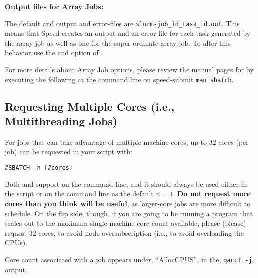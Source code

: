 \textbf{Output files for Array Jobs:}

The default and output and error-files are
\texttt{slurm-job\_id\_task\_id.out}.
%
This means that Speed creates an output and an error-file for each task 
generated by the array-job as well as one for the super-ordinate array-job. 
To alter this behavior use the  and  option of
. 

For more details about Array Job options, please review the manual pages for 
 by executing the following at the command line on speed-submit 
\texttt{man sbatch}.
 
\subsection{Requesting Multiple Cores (i.e., Multithreading Jobs)}

For jobs that can take advantage of multiple machine cores, up to 32 cores
(per job) can be requested in your script with: 

\begin{verbatim}
#SBATCH -n [#cores] 
\end{verbatim}

Both  and  support  on the command line,
and it should always be used either in the script or on the command line as the
default $n=1$.
\textbf{Do not request more cores than you think will be useful}, as larger-core
jobs are more difficult to schedule. On the flip side, though, if you 
are going to be running a program that scales out to the maximum single-machine
core count available, please (please) request 32 cores, to avoid node 
oversubscription (i.e., to avoid overloading the CPUs).

Core count associated with a job appears under,
``AllocCPUS'', in the, \texttt{qacct -j}, output.

